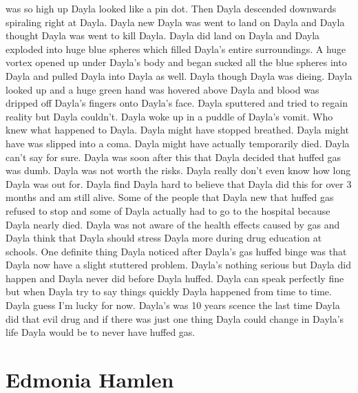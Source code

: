 \documentclass[12pt]{book}
\begin{document}
was so high up Dayla looked like a pin dot. Then Dayla descended downwards spiraling right at Dayla. Dayla new Dayla was went to land on Dayla and Dayla thought Dayla was went to kill Dayla. Dayla did land on Dayla and Dayla exploded into huge blue spheres which filled Dayla's entire surroundings. A huge vortex opened up under Dayla's body and began sucked all the blue spheres into Dayla and pulled Dayla into Dayla as well. Dayla though Dayla was dieing. Dayla looked up and a huge green hand was hovered above Dayla and blood was dripped off Dayla's fingers onto Dayla's face. Dayla sputtered and tried to regain reality but Dayla couldn't. Dayla woke up in a puddle of Dayla's vomit. Who knew what happened to Dayla. Dayla might have stopped breathed. Dayla might have was slipped into a coma. Dayla might have actually temporarily died. Dayla can't say for sure. Dayla was soon after this that Dayla decided that huffed gas was dumb. Dayla was not worth the risks. Dayla really don't even know how long Dayla was out for. Dayla find Dayla hard to believe that Dayla did this for over 3 months and am still alive. Some of the people that Dayla new that huffed gas refused to stop and some of Dayla actually had to go to the hospital because Dayla nearly died. Dayla was not aware of the health effects caused by gas and Dayla think that Dayla should stress Dayla more during drug education at schools. One definite thing Dayla noticed after Dayla's gas huffed binge was that Dayla now have a slight stuttered problem. Dayla's nothing serious but Dayla did happen and Dayla never did before Dayla huffed. Dayla can speak perfectly fine but when Dayla try to say things quickly Dayla happened from time to time. Dayla guess I'm lucky for now. Dayla's was 10 years scence the last time Dayla did that evil drug and if there was just one thing Dayla could change in Dayla's life Dayla would be to never have huffed gas.



\chapter{Edmonia Hamlen}
\end{document}
